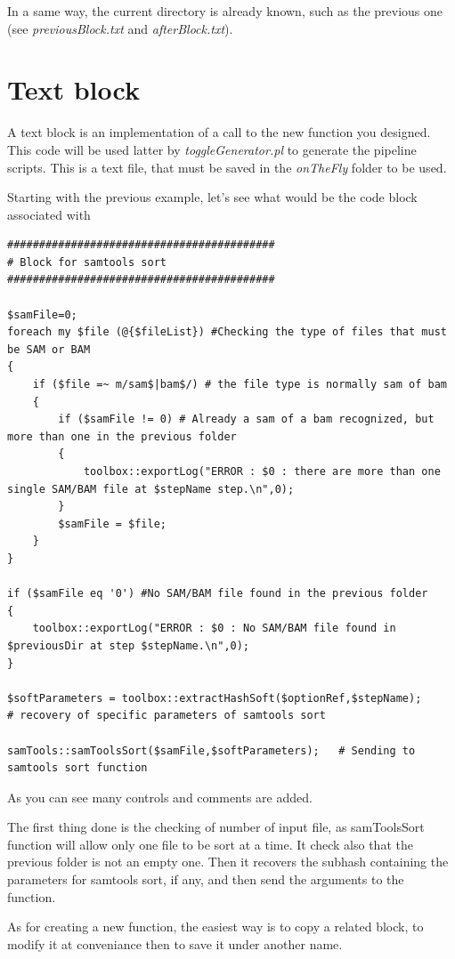 \documentclass[a4paper,10pt]{report}
\begin{document}
In a same way, the current directory is already known, such as the previous one (see \emph{previousBlock.txt} and \emph{afterBlock.txt}).

\section{Text block}

A text block is an implementation of a call to the new function you designed. This code will be used latter by \textit{toggleGenerator.pl} to generate the pipeline scripts. This is a text file, that must be saved in the \emph{onTheFly} folder to be used.

Starting with the previous example, let's see what would be the code block associated with

\begin{lstlisting}
##########################################
# Block for samtools sort
##########################################

$samFile=0;
foreach my $file (@{$fileList}) #Checking the type of files that must be SAM or BAM
{
    if ($file =~ m/sam$|bam$/) # the file type is normally sam of bam
    {
        if ($samFile != 0) # Already a sam of a bam recognized, but more than one in the previous folder
        {
            toolbox::exportLog("ERROR : $0 : there are more than one single SAM/BAM file at $stepName step.\n",0);
        }
        $samFile = $file;
    }
}

if ($samFile eq '0') #No SAM/BAM file found in the previous folder
{
    toolbox::exportLog("ERROR : $0 : No SAM/BAM file found in $previousDir at step $stepName.\n",0);
}

$softParameters = toolbox::extractHashSoft($optionRef,$stepName);     # recovery of specific parameters of samtools sort

samTools::samToolsSort($samFile,$softParameters);   # Sending to samtools sort function
\end{lstlisting}

As you can see many controls and comments are added.

The first thing done is the checking of number of input file, as samToolsSort function will allow only one file to be sort at a time. It check also that the previous folder is not an empty one.
Then it recovers the subhash containing the parameters for samtools sort, if any, and then send the arguments to the function.

As for creating a new function, the easiest way is to copy a related block, to modify it at conveniance then to save it under another name.
\end{document}
